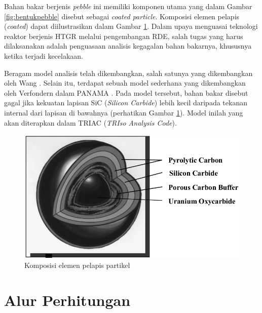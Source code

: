 \documentclass[a4paper,11pt]{report}
\begin{document}
Bahan bakar berjenis \textit{pebble} ini memiliki komponen utama yang dalam Gambar \ref{fig:bentukpebble} disebut sebagai \textit{coated particle}. Komposisi elemen pelapis (\textit{coated}) dapat diilustrasikan dalam Gambar \ref{fig:pelapis}. Dalam upaya menguasai teknologi reaktor berjenis HTGR melalui pengembangan RDE, salah tugas yang harus dilaksanakan adalah penguasaan analisis kegagalan bahan bakarnya, khususnya ketika terjadi kecelakaan.

Beragam model analisis telah dikembangkan, salah satunya yang dikembangkan oleh Wang \cite{wang2004integrated}. Selain itu, terdapat sebuah model sederhana yang dikembangkan oleh Verfondern dalam PANAMA \cite{VERFONDERN201484}. Pada model tersebut, bahan bakar disebut gagal jika kekuatan lapisan SiC (\textit{Silicon Carbide}) lebih kecil daripada tekanan internal dari lapisan di bawahnya (perhatikan Gambar \ref{fig:pelapis}). Model inilah yang akan diterapkan dalam TRIAC (\textit{TRIso Analysis Code}).

\begin{figure}[h]
  \centering
  \includegraphics[scale=.5]{pics/triso.png}
  \caption[Komposisi elemen pelapis partikel]{Komposisi elemen pelapis partikel \cite{wang2004integrated}}
  \label{fig:pelapis}
\end{figure}

\chapter{Alur Perhitungan}
\end{document}
